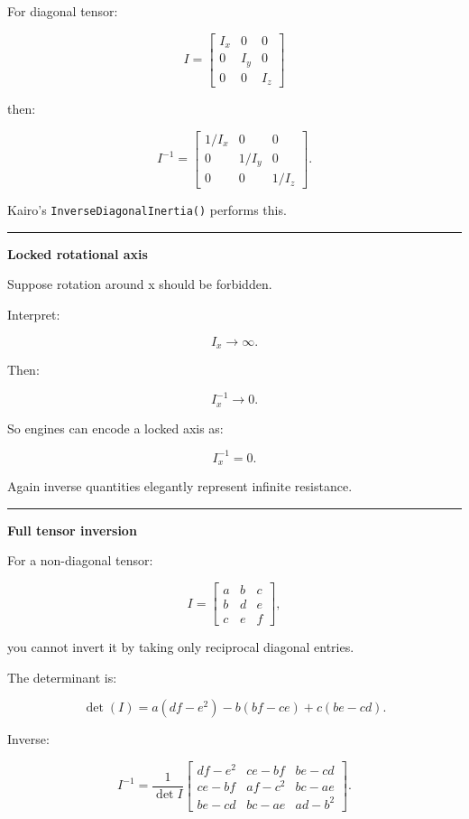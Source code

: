 For diagonal tensor:

\[
I=
\begin{bmatrix}
I_x&0&0\\
0&I_y&0\\
0&0&I_z
\end{bmatrix}
\]

then:

\[
\boxed{
I^{-1}
=
\begin{bmatrix}
1/I_x&0&0\\
0&1/I_y&0\\
0&0&1/I_z
\end{bmatrix}.
}
\]

Kairo's \texttt{InverseDiagonalInertia()} performs this.

\begin{center}\rule{0.5\linewidth}{0.5pt}\end{center}

\textbf{Locked rotational axis}

Suppose rotation around x should be forbidden.

Interpret:

\[
I_x\rightarrow\infty.
\]

Then:

\[
I_x^{-1}\rightarrow0.
\]

So engines can encode a locked axis as:

\[
I_x^{-1}=0.
\]

Again inverse quantities elegantly represent infinite resistance.

\begin{center}\rule{0.5\linewidth}{0.5pt}\end{center}

\textbf{Full tensor inversion}

For a non-diagonal tensor:

\[
I=
\begin{bmatrix}
a&b&c\\
b&d&e\\
c&e&f
\end{bmatrix},
\]

you cannot invert it by taking only reciprocal diagonal entries.

The determinant is:

\[
\det(I)
=
a(df-e^2)
-
b(bf-ce)
+
c(be-cd).
\]

Inverse:

\[
I^{-1}
=
\frac1{\det I}
\begin{bmatrix}
df-e^2 & ce-bf & be-cd\\
ce-bf & af-c^2 & bc-ae\\
be-cd & bc-ae & ad-b^2
\end{bmatrix}.
\]

